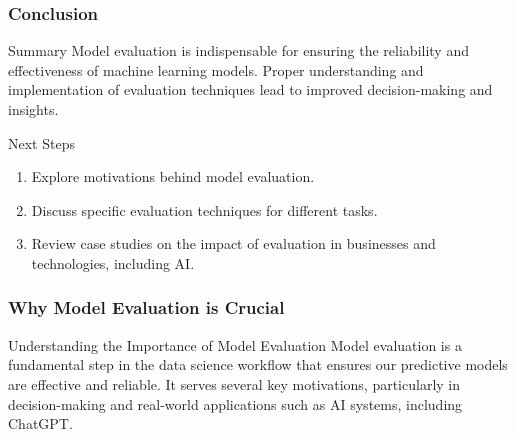 \documentclass[aspectratio=169]{beamer}
\begin{document}
\begin{frame}[fragile]
    \frametitle{Conclusion}
    
    \begin{block}{Summary}
        Model evaluation is indispensable for ensuring the reliability and effectiveness of machine learning models. Proper understanding and implementation of evaluation techniques lead to improved decision-making and insights.
    \end{block}

    \begin{block}{Next Steps}
        \begin{enumerate}
            \item Explore motivations behind model evaluation.
            \item Discuss specific evaluation techniques for different tasks.
            \item Review case studies on the impact of evaluation in businesses and technologies, including AI.
        \end{enumerate}
    \end{block}
    
\end{frame}

\begin{frame}[fragile]
    \frametitle{Why Model Evaluation is Crucial}
    \begin{block}{Understanding the Importance of Model Evaluation}
        Model evaluation is a fundamental step in the data science workflow that ensures our predictive models are effective and reliable. It serves several key motivations, particularly in decision-making and real-world applications such as AI systems, including ChatGPT.
    \end{block}
\end{frame}
\end{document}
